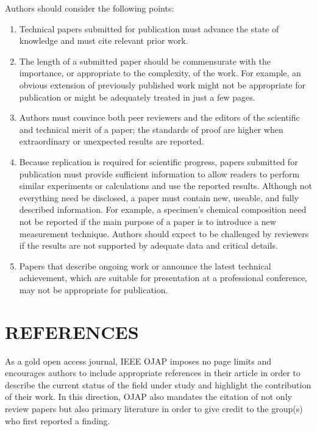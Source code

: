 \documentclass{IEEEoj}
\begin{document}
Authors should consider the following points:

\begin{enumerate}
\item Technical papers submitted for publication must advance the state of knowledge and must cite relevant prior work. 
\item The length of a submitted paper should be commensurate with the importance, or appropriate to the complexity, of the work. For example, an obvious extension of previously published work might not be appropriate for publication or might be adequately treated in just a few pages.
\item Authors must convince both peer reviewers and the editors of the scientific and technical merit of a paper; the standards of proof are higher when extraordinary or unexpected results are reported. 
\item Because replication is required for scientific progress, papers submitted for publication must provide sufficient information to allow readers to perform similar experiments or calculations and use the reported results. Although not everything need be disclosed, a paper must contain new, useable, and fully described information. For example, a specimen's chemical composition need not be reported if the main purpose of a paper is to introduce a new measurement technique. Authors should expect to be challenged by reviewers if the results are not supported by adequate data and critical details.
\item Papers that describe ongoing work or announce the latest technical achievement, which are suitable for presentation at a professional conference, may not be appropriate for publication.
\end{enumerate}

\section*{REFERENCES}

As a gold open access journal, IEEE OJAP imposes no page limits and encourages authors to include appropriate references in their article in order to describe the current status of the field under study and highlight the contribution of their work. In this direction, OJAP also mandates the citation of not only review papers but also primary literature in order to give credit to the group(s) who first reported a finding.

\def\refname{\vadjust{\vspace*{-1em}}} %
\end{document}
